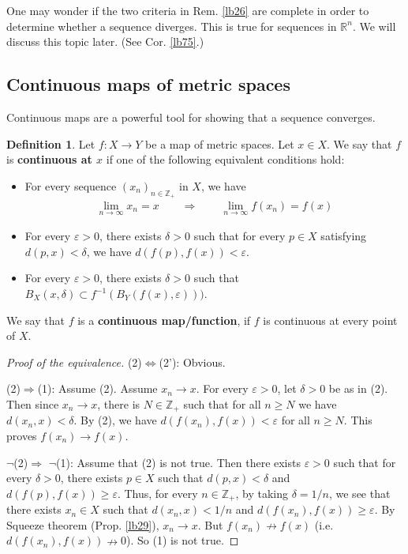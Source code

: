 \documentclass[12pt,b5paper,notitlepage]{article}
\theoremstyle{definition}
\newtheorem{df}{Definition}[section]
\theoremstyle{plain}
\newcommand{\Zbb}{\mathbb Z}
\newcommand{\Rbb}{\mathbb R}
\numberwithin{equation}{section}
\begin{document}
One may wonder if the two criteria in Rem. \ref{lb26} are complete in order to determine whether a sequence diverges. This is true for sequences in $\Rbb^n$. We will discuss this topic later. (See Cor. \ref{lb75}.)



\subsection{Continuous maps of metric spaces}\label{lb185}

Continuous maps are a powerful tool for showing that a sequence converges.


\begin{df}\label{lb31}
Let $f:X\rightarrow Y$ be a map of metric spaces. Let $x\in X$. We say that $f$ is \textbf{continuous at $x$} if one of the following equivalent conditions hold:
\begin{itemize}[align=left]
\item [(1)] For every sequence $(x_n)_{n\in\Zbb_+}$ in $X$, we have
\begin{align*}
\lim_{n\rightarrow\infty} x_n=x\qquad\Longrightarrow\qquad \lim_{n\rightarrow\infty} f(x_n)=f(x)
\end{align*}
\item[(2)] For every $\varepsilon>0$, there exists $\delta>0$ such that for every $p\in X$ satisfying $d(p,x)<\delta$, we have $d(f(p),f(x))<\varepsilon$.
\item[(2')] For every $\varepsilon>0$, there exists $\delta>0$ such that $B_X(x,\delta)\subset f^{-1}(B_Y(f(x),\varepsilon)))$.
\end{itemize}
We say that $f$ is a \textbf{continuous map/function}, if $f$ is continuous at every point of $X$.
\end{df}

\begin{proof}[Proof of the equivalence]
(2)$\Leftrightarrow$(2'): Obvious.

(2)$\Rightarrow$(1): Assume (2). Assume $x_n\rightarrow x$. For every $\varepsilon>0$, let $\delta>0$ be as in (2). Then since $x_n\rightarrow x$, there is $N\in\Zbb_+$ such that for all $n\geq N$ we have $d(x_n,x)<\delta$. By (2), we have $d(f(x_n),f(x))<\varepsilon$ for all $n\geq N$. This proves $f(x_n)\rightarrow f(x)$.

$\neg$(2)$\Rightarrow$ $\neg$(1): Assume that (2) is not true. Then there exists $\varepsilon>0$ such that for every $\delta>0$, there exists $p\in X$ such that $d(p,x)<\delta$ and $d(f(p),f(x))\geq\varepsilon$. Thus, for every $n\in\Zbb_+$, by taking $\delta=1/n$, we see that there exists $x_n\in X$ such that $d(x_n,x)<1/n$ and $d(f(x_n),f(x))\geq\varepsilon$. By Squeeze theorem (Prop. \ref{lb29}), $x_n\rightarrow x$. But $f(x_n)\nrightarrow f(x)$ (i.e. $d(f(x_n),f(x))\nrightarrow 0$). So (1) is not true.
\end{proof}
\end{document}
